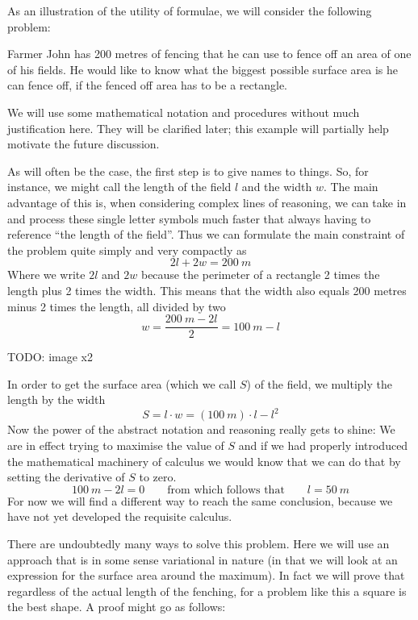 \documentclass{report}
\begin{document}
\begin{example}
As an illustration of the utility of formulae, we will consider the following problem:

Farmer John has 200 metres of fencing that he can use to fence off an area of one of his fields. He would like to know what the biggest possible surface area is he can fence off, if the fenced off area has to be a rectangle.

We will use some mathematical notation and procedures without much justification here. They will be clarified later; this example will partially help motivate the future discussion. 

As will often be the case, the first step is to give names to things. So, for instance, we might call the length of the field $l$ and the width $w$. The main advantage of this is, when considering complex lines of reasoning, we can take in and process these single letter symbols much faster that always having to reference ``the length of the field''. Thus we can formulate the main constraint of the problem quite simply and very compactly as
\[ 2l + 2w = \SI{200}{m} \]
Where we write $2l$ and $2w$ because the perimeter of a rectangle 2 times the length plus 2 times the width. This means that the width also equals 200 metres minus 2 times the length, all divided by two
\[w = \frac{\SI{200}{m} - 2l}{2} = \SI{100}{m}-l\]

TODO: image x2

In order to get the surface area (which we call $S$) of the field, we multiply the length by the width
\[S = l\cdot w = (\SI{100}{m})\cdot l - l^2 \]
Now the power of the abstract notation and reasoning really gets to shine: We are in effect trying to maximise the value of $S$ and if we had properly introduced the mathematical machinery of calculus we would know that we can do that by setting the derivative of $S$ to zero.
\[ \SI{100}{m} - 2l = 0 \qquad \text{from which follows that} \qquad l = \SI{50}{m} \]
For now we will find a different way to reach the same conclusion, because we have not yet developed the requisite calculus.

There are undoubtedly many ways to solve this problem. Here we will use an approach that is in some sense variational in nature (in that we will look at an expression for the surface area around the maximum). In fact we will prove that regardless of the actual length of the fenching, for a problem like this a square is the best shape. A proof might go as follows:


\end{example}
\end{document}
